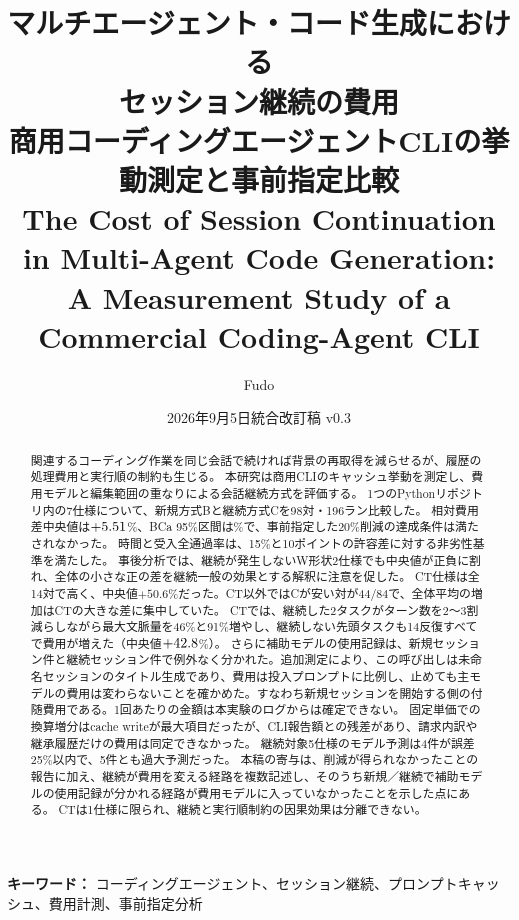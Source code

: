\documentclass[a4paper,11pt]{article}
\title{\sffamily マルチエージェント・コード生成における\\セッション継続の費用\\[0.6em]
\large 商用コーディングエージェントCLIの挙動測定と事前指定比較\\[0.8em]
\normalsize The Cost of Session Continuation in Multi-Agent Code Generation:\\
A Measurement Study of a Commercial Coding-Agent CLI}
\author{Fudo}
\date{2026年9月5日\quad 統合改訂稿 v0.3}
\begin{document}
\maketitle
\begin{abstract}
関連するコーディング作業を同じ会話で続ければ背景の再取得を減らせるが、履歴の処理費用と実行順の制約も生じる。
本研究は商用CLIのキャッシュ挙動を測定し、費用モデルと編集範囲の重なりによる会話継続方式を評価する。
1つのPythonリポジトリ内の7仕様について、新規方式Bと継続方式Cを98対・196ラン比較した。
相対費用差中央値は$+5.51$\%、BCa 95\%区間は\CostCI\%で、事前指定した20\%削減の達成条件は満たされなかった。
時間と受入全通過率は、15\%と10ポイントの許容差に対する非劣性基準を満たした。
事後分析では、継続が発生しないW形状2仕様でも中央値が正負に割れ、全体の小さな正の差を継続一般の効果とする解釈に注意を促した。
CT仕様は全14対で高く、中央値$+50.6$\%だった。CT以外ではCが安い対が44/84で、全体平均の増加はCTの大きな差に集中していた。
CTでは、継続した2タスクがターン数を2〜3割減らしながら最大文脈量を46\%と91\%増やし、継続しない先頭タスクも14反復すべてで費用が増えた（中央値$+42.8$\%）。
さらに補助モデルの使用記録は、新規セッション\AuxFresh 件と継続セッション\AuxResumed 件で例外なく分かれた。追加測定により、この呼び出しは未命名セッションのタイトル生成であり、費用は投入プロンプトに比例し、止めても主モデルの費用は変わらないことを確かめた。すなわち新規セッションを開始する側の付随費用である。1回あたりの金額は本実験のログからは確定できない。
固定単価での換算増分はcache writeが最大項目だったが、CLI報告額との残差があり、請求内訳や継承履歴だけの費用は同定できなかった。
継続対象5仕様のモデル予測は4件が誤差25\%以内で、5件とも過大予測だった。
本稿の寄与は、削減が得られなかったことの報告に加え、継続が費用を変える経路を複数記述し、そのうち新規／継続で補助モデルの使用記録が分かれる経路が費用モデルに入っていなかったことを示した点にある。
CTは1仕様に限られ、継続と実行順制約の因果効果は分離できない。
\end{abstract}

\noindent\textbf{キーワード：} コーディングエージェント、セッション継続、プロンプトキャッシュ、費用計測、事前指定分析

\clearpage
\end{document}
